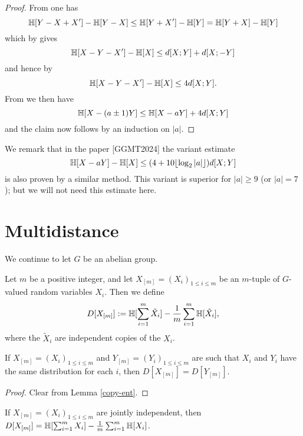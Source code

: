 \begin{proof}\leanok From  one has
  $$\mathbb{H}[Y-X+X'] - \mathbb{H}[Y-X] \leq \mathbb{H}[Y+X'] - \mathbb{H}[Y] = \mathbb{H}[Y+X] - \mathbb{H}[Y]$$
  which by  gives
  $$\mathbb{H}[X-Y-X'] -\mathbb{H}[X] \leq d[X;Y] + d[X;-Y]$$
  and hence by 
  $$\mathbb{H}[X-Y-X'] - \mathbb{H}[X] \leq 4d[X;Y].$$
  From  we then have
  $$\mathbb{H}[X-(a\pm 1)Y] \leq \mathbb{H}[X-aY] + 4 d[X;Y]$$
and the claim now follows by an induction on $|a|$.
\end{proof}

We remark that in the paper [GGMT2024] the variant estimate
$$\mathbb{H}[X-aY] - \mathbb{H}[X] \leq (4 + 10 \lfloor \log_2 |a| \rfloor) d[X;Y]$$
is also proven by a similar method.  This variant is superior for $|a| \geq 9$ (or $|a|=7$); but we will not need this estimate here.



\section{Multidistance}

We continue to let $G$ be an abelian group.

\begin{definition}[Multidistance]\label{multidist-def}\leanok  Let $m$ be a positive integer, and let $X_{[m]} = (X_i)_{1 \leq i \leq m}$ be an $m$-tuple of $G$-valued random variables $X_i$. Then we define
\[
  D[X_{[m]}] := \mathbb{H}[\sum_{i=1}^m \tilde X_i] - \frac{1}{m} \sum_{i=1}^m \mathbb{H}[\tilde X_i],
\]
where the $\tilde X_i$ are independent copies of the $X_i$.
\end{definition}

\begin{lemma}\label{multidist-copy}\leanok  If $X_{[m]} = (X_i)_{1 \leq i \leq m}$ and $Y_{[m]} = (Y_i)_{1 \leq i \leq m}$ are such that $X_i$ and $Y_i$ have the same distribution for each $i$, then $D[X_{[m]}] = D[Y_{[m]}]$.
\end{lemma}

\begin{proof} Clear from Lemma \ref{copy-ent}.
\end{proof}

\begin{lemma}\label{multidist-indep}\leanok  If $X_{[m]} = (X_i)_{1 \leq i \leq m}$ are jointly independent, then $D[X_{[m]}] = \mathbb{H}[\sum_{i=1}^m X_i] - \frac{1}{m} \sum_{i=1}^m \mathbb{H}[X_i]$.
\end{lemma}

